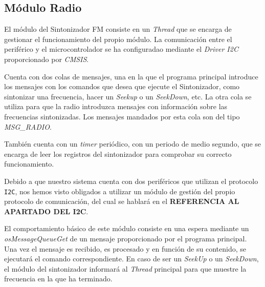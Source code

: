 \subsection{Módulo Radio}
El módulo del Sintonizador FM consiste en un \textit{Thread} que se encarga de gestionar el funcionamiento del propio módulo. La comunicación entre el periférico y el microcontrolador se ha configuradao mediante el \textit{Driver I2C} proporcionado por \textit{CMSIS}.

Cuenta con dos colas de mensajes, una en la que el programa principal introduce los mensajes con los comandos que desea que ejecute el Sintonizador, como sintonizar una frecuencia, hacer un \textit{Seekup} o un \textit{SeekDown}, etc. La otra cola se utiliza para que la radio introduzca mensajes con información sobre las frecuencias sintonizadas. Los mensajes mandados por esta cola son del tipo \textit{MSG\_RADIO}.

También cuenta con un \textit{timer} periódico, con un periodo de medio segundo, que se encarga de leer los registros del sintonizador para comprobar su correcto funcionamiento.

Debido a que nuestro sistema cuenta con dos periféricos que utilizan el protocolo \texttt{I2C}, nos hemos visto obligados a utilizar un módulo de gestión del propio protocolo de comunicación, del cual se hablará en el \textbf{REFERENCIA AL APARTADO DEL I2C}.

El comportamiento básico de este módulo consiste en una espera mediante un \textit{osMessageQueueGet} de un mensaje proporcionado por el programa principal. Una vez el mensaje es recibido, es procesado y en función de su contenido, se ejecutará el comando correspondiente. En caso de ser un \textit{SeekUp} o un \textit{SeekDown}, el módulo del sintonizador informará al \textit{Thread} principal para que muestre la frecuencia en la que ha terminado.